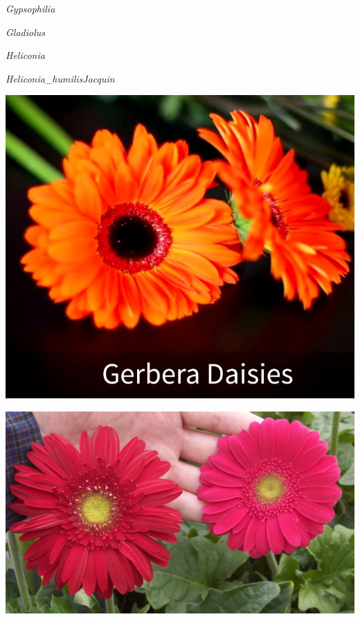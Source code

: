 \documentclass{article}
\begin{document}
\noindent
\vfill
\centerline{{\Large\emph{Gypsophilia}}}
\vfill
\newpage

\noindent
\vfill
\centerline{{\Large\emph{Gladiolus}}}
\vfill
\newpage

\noindent
\vfill
\centerline{{\Large\emph{Heliconia}}}
\vfill
\newpage

\noindent
\vfill
\centerline{{\Large\emph{Heliconia_humilisJacquin}}}
\vfill
\newpage

\begin{center}
\includegraphics[height=0.9\textheight, angle=90]{../Gerbera_Daisies.jpg}
\end{center}
\newpage

\begin{center}
\includegraphics[height=0.9\textheight, angle=90]{../Gerbera_PassionMaya.jpg}
\end{center}
\newpage
\end{document}
